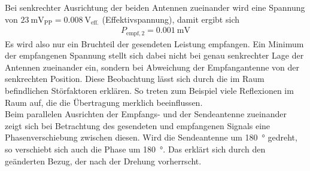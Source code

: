 \documentclass[a4paper,twoside,final]{article}
\begin{document}
Bei senkrechter Ausrichtung der beiden Antennen zueinander wird eine Spannung von $\SI{23}{\milli\volt_\text{PP}} = \SI{0,008}{\volt_\text{eff.}}$ (Effektivspannung), damit ergibt sich
\begin{align}
P_{\text{empf},2} = \SI{0,001}{\milli\volt}
\end{align}
Es wird also nur ein Bruchteil der gesendeten Leistung empfangen. Ein Minimum der empfangenen Spannung stellt sich dabei nicht bei genau senkrechter Lage der Antennen zueinander ein, sondern bei Abweichung der Empfangantenne von der senkrechten Position. Diese Beobachtung lässt sich durch die im Raum befindlichen Störfaktoren
erklären. So treten zum Beispiel viele Reflexionen im Raum auf, die die Übertragung merklich beeinflussen. \\
Beim parallelen Ausrichten der Empfangs- und der Sendeantenne zueinander zeigt sich bei Betrachtung des gesendeten und empfangenen Signals eine Phasenverschiebung zwischen diesen. Wird die Sendeantenne um \SI{180}{\degree} gedreht, so verschiebt sich auch die Phase um \SI{180}{\degree}. Das erklärt sich durch den geänderten Bezug, der nach der Drehung vorherrscht.\\
\end{document}
